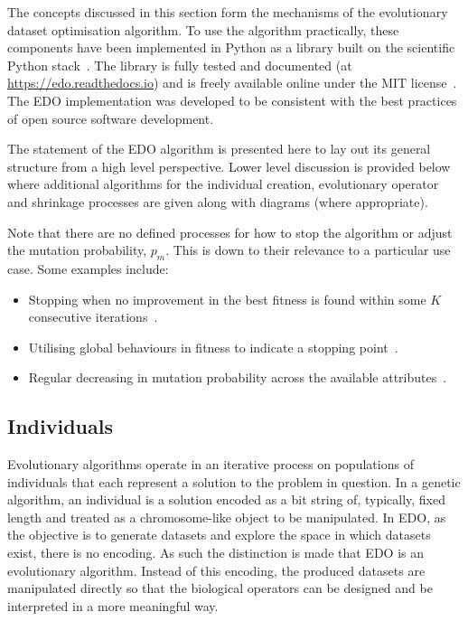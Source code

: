 The concepts discussed in this section form the mechanisms of the evolutionary
dataset optimisation algorithm. To use the algorithm practically, these
components have been implemented in Python as a library built on the scientific
Python stack~\cite{pandas,numpy}. The library is fully tested and documented (at
\url{https://edo.readthedocs.io}) and is freely available online under the MIT
license~\cite{edo-project}. The EDO implementation was developed to be
consistent with the best practices of open source software development.

\label{alg:edo}


The statement of the EDO algorithm is presented here to lay out its general
structure from a high level perspective. Lower level discussion is provided
below where additional algorithms for the individual creation, evolutionary
operator and shrinkage processes are given along with diagrams (where
appropriate).

Note that there are no defined processes for how to stop the algorithm or adjust
the mutation probability, \(p_m\). This is down to their relevance to a
particular use case. Some examples include:

\begin{itemize}
    \item Stopping when no improvement in the best fitness is found within some
        \(K\) consecutive iterations~\cite{Leung2001}.
    \item Utilising global behaviours in fitness to indicate a stopping
        point~\cite{Marti2016}.
    \item Regular decreasing in mutation probability across the available
        attributes~\cite{Kuehn2013}.
\end{itemize}

\subsection{Individuals}

Evolutionary algorithms operate in an iterative process on populations of
individuals that each represent a solution to the problem in question. In a
genetic algorithm, an individual is a solution encoded as a bit string of,
typically, fixed length and treated as a chromosome-like object to be
manipulated. In EDO, as the objective is to generate datasets and explore the
space in which datasets exist, there is no encoding. As such the distinction is
made that EDO is an evolutionary algorithm. Instead of this encoding, the
produced datasets are manipulated directly so that the biological operators can
be designed and be interpreted in a more meaningful way.

